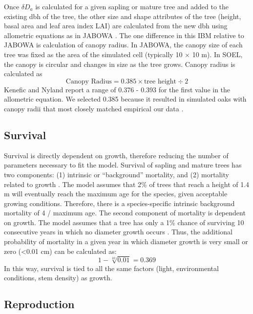 \documentclass[
11pt, %
a4paper, %
oneside, %
headinclude,footinclude, %
]{scrartcl}
\begin{document}
Once $\delta D_a$ is calculated for a given sapling or mature tree and added to the existing dbh of the tree, the other size and shape attributes of the tree (height, basal area and leaf area index LAI) are calculated from the new dbh using allometric equations as in JABOWA \citep{Botkin1993}. The one difference in this IBM relative to JABOWA is calculation of canopy radius. In JABOWA, the canopy size of each tree was fixed as the area of the simulated cell (typically 10 $\times$ 10 m). In SOEL, the canopy is circular and changes in size as the tree grows. Canopy radius is calculated as
\begin{equation}
\text{Canopy Radius} = 0.385 \times \text{tree height} \div 2
\end{equation}
Kenefic and Nyland \citep{Kenefic1999} report a range of 0.376 - 0.393 for the first value in the allometric equation. We selected 0.385 because it resulted in simulated oaks with canopy radii that most closely matched empirical our data \citep{Kellner2014b}.

\subsection{Survival}

Survival is directly dependent on growth, therefore reducing the number of parameters necessary to fit the model. Survival of sapling and mature trees has two components: (1) intrinsic or ``background'' mortality, and (2) mortality related to growth \citep{Botkin1993}. The model assumes that 2\% of trees that reach a height of 1.4 m will eventually reach the maximum age for the species, given acceptable growing conditions. Therefore, there is a species-specific intrinsic background mortality of 4 / maximum age. The second component of mortality is dependent on growth. The model assumes that a tree has only a 1\% chance of surviving 10 consecutive years in which no diameter growth occurs \citep{Botkin1993}. Thus, the additional probability of mortality in a given year in which diameter growth is very small or zero (\textless 0.01 cm) can be calculated as:
\begin{equation}
1 - \sqrt[10]{0.01} = 0.369
\end{equation}
In this way, survival is tied to all the same factors (light, environmental conditions, stem density) as growth.

\subsection{Reproduction}
\label{repro}
\end{document}
